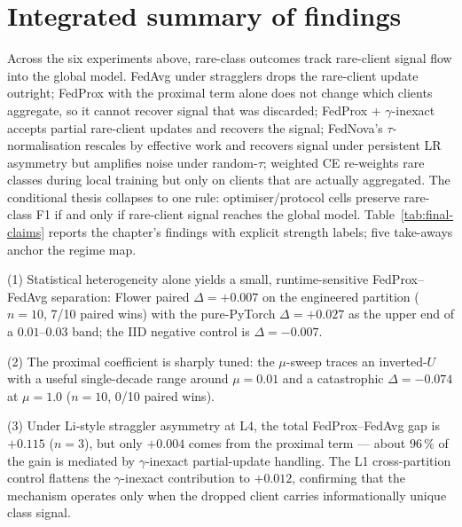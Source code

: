 \documentclass[11pt,a4paper]{report}
\begin{document}

\section{Integrated summary of findings}
\label{sec:integrated-summary}

Across the six experiments above, rare-class outcomes track rare-client
signal flow into the global model. FedAvg under stragglers drops the
rare-client update outright; FedProx with the proximal term alone does
not change which clients aggregate, so it cannot recover signal that was
discarded; FedProx + $\gamma$-inexact accepts partial rare-client updates
and recovers the signal; FedNova's $\tau$-normalisation rescales by
effective work and recovers signal under persistent LR asymmetry but
amplifies noise under random-$\tau$; weighted CE re-weights rare classes
during local training but only on clients that are actually aggregated.
The conditional thesis collapses to one rule: optimiser/protocol cells
preserve rare-class F1 if and only if rare-client signal reaches the
global model. Table~\ref{tab:final-claims} reports the chapter's findings
with explicit strength labels; five take-aways anchor the regime map.

(1) Statistical heterogeneity alone yields a small, runtime-sensitive
FedProx--FedAvg separation: Flower paired $\Delta = +0.007$ on the
engineered partition ($n=10$, 7/10 paired wins) with the pure-PyTorch
$\Delta = +0.027$ as the upper end of a $0.01$--$0.03$ band; the IID
negative control is $\Delta = -0.007$.

(2) The proximal coefficient is sharply tuned: the $\mu$-sweep traces an
inverted-$U$ with a useful single-decade range around $\mu = 0.01$ and a
catastrophic $\Delta = -0.074$ at $\mu = 1.0$ ($n=10$, 0/10 paired wins).

(3) Under Li-style straggler asymmetry at L4, the total FedProx--FedAvg gap
is $+0.115$ ($n=3$), but only $+0.004$ comes from the proximal term ---
about $96\,\%$ of the gain is mediated by $\gamma$-inexact partial-update
handling. The L1 cross-partition control flattens the $\gamma$-inexact
contribution to $+0.012$, confirming that the mechanism operates only when
the dropped client carries informationally unique class signal.
\end{document}

